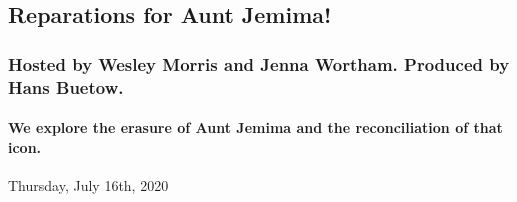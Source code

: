 \hypertarget{reparations-for-aunt-jemima-2}{%
\subsection{Reparations for Aunt
Jemima!}\label{reparations-for-aunt-jemima-2}}

\hypertarget{hosted-by-wesley-morris-and-jenna-wortham-produced-by-hans-buetow-1}{%
\subsubsection{Hosted by Wesley Morris and Jenna Wortham. Produced by
Hans
Buetow.}\label{hosted-by-wesley-morris-and-jenna-wortham-produced-by-hans-buetow-1}}

\hypertarget{we-explore-the-erasure-of-aunt-jemima-and-the-reconciliation-of-that-icon-2}{%
\paragraph{We explore the erasure of Aunt Jemima and the reconciliation
of that
icon.}\label{we-explore-the-erasure-of-aunt-jemima-and-the-reconciliation-of-that-icon-2}}

Thursday, July 16th, 2020

